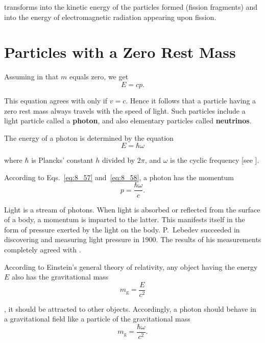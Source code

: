 \noindent
transforms into the kinetic energy of the particles formed (fission fragments) and into the energy of electromagnetic radiation appearing upon fission.

\section{Particles with a Zero Rest Mass}\label{sec:8_10}

Assuming in  that $m$ equals zero, we get
\begin{equation}\label{eq:8_57}
	E = cp.
\end{equation}

\noindent
This equation agrees with  only if $v=c$. Hence it follows that a particle having a zero rest mass always travels with the speed of light. Such particles include a light particle called a \textbf{photon}, and also elementary particles called \textbf{neutrinos}.

The energy of a photon is determined by the equation
\begin{equation}\label{eq:8_58}
	E = \hbar\omega
\end{equation}

\noindent
where $\hbar$ is Plancks' constant $h$ divided by $2\pi$, and $\omega$ is the cyclic frequency [see ].

According to Eqs.~\eqref{eq:8_57} and~\eqref{eq:8_58}, a photon has the momentum
\begin{equation}\label{eq:8_59}
	p = \frac{\hbar\omega}{c}.
\end{equation}

\noindent
Light is a stream of photons. When light is absorbed or reflected from the surface of a body, a momentum is imparted to the latter. This manifests itself in the form of pressure exerted by the light on the body. P.~Lebedev succeeded in discovering and measuring light pressure in 1900. The results of his measurements completely agreed with .

According to Einstein's general theory of relativity, any object having the energy $E$ also has the gravitational mass
\begin{equation*}
	m_{\text{g}} = \frac{E}{c^2}
\end{equation*}

\noindent
\ie, it should be attracted to other objects. Accordingly, a photon should behave in a gravitational field like a particle of the gravitational mass
\begin{equation}\label{eq:8_60}
	m_{\text{g}} = \frac{\hbar\omega}{c^2}.
\end{equation}


